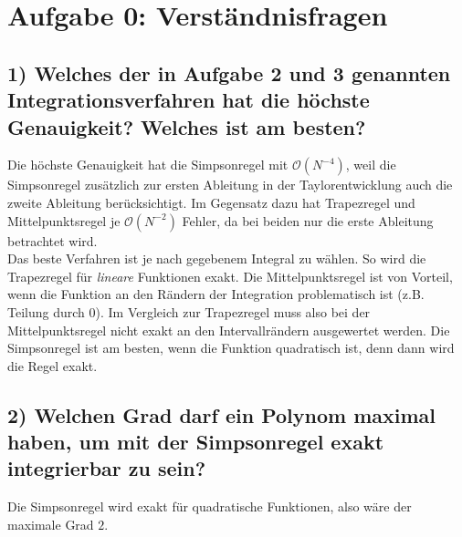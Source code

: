 \setcounter{secnumdepth}{0}
\section{Aufgabe 0: Verständnisfragen}
\label{sec:auf0}

\subsection{1) \textbf{Welches der in Aufgabe 2 und 3 genannten Integrationsverfahren hat die höchste Genauigkeit? Welches ist am besten?}}
Die höchste Genauigkeit hat die Simpsonregel mit $\mathcal{O}(N^{-4})$, weil die Simpsonregel zusätzlich zur ersten Ableitung in der Taylorentwicklung auch die zweite Ableitung berücksichtigt.
Im Gegensatz dazu hat Trapezregel  und Mittelpunktsregel je $\mathcal{O}(N^{-2})$ Fehler, da bei beiden nur die erste Ableitung betrachtet wird.\\
Das beste Verfahren ist je nach gegebenem Integral zu wählen.
So wird die Trapezregel für \textit{lineare} Funktionen exakt.
Die Mittelpunktsregel ist von Vorteil, wenn die Funktion an den Rändern der Integration problematisch ist (z.B. Teilung durch 0).
Im Vergleich zur Trapezregel muss also bei der Mittelpunktsregel nicht exakt an den Intervallrändern ausgewertet werden.
Die Simpsonregel ist am besten, wenn die Funktion quadratisch ist, denn dann wird die Regel exakt.

\subsection{2) \textbf{Welchen Grad darf ein Polynom maximal haben, um mit der Simpsonregel exakt integrierbar zu sein?}}
Die Simpsonregel wird exakt für quadratische Funktionen, also wäre der maximale Grad $2$.